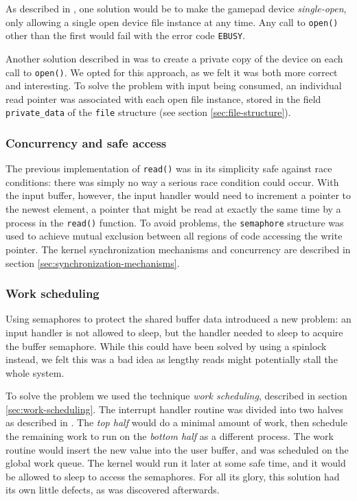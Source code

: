 As described in \cite{linux-device-drivers}, one solution would be to make the gamepad device \emph{single-open}, only allowing a single open device file instance at any time. Any call to \texttt{open()} other than the first would fail with the error code \texttt{EBUSY}.

Another solution described in \cite{linux-device-drivers} was to create a private copy of the device on each call to \texttt{open()}. We opted for this approach, as we felt it was both more correct and interesting. To solve the problem with input being consumed, an individual read pointer was associated with each open file instance, stored in the field \texttt{private\_data} of the \texttt{file} structure (see section \ref{sec:file-structure}).

\subsubsection{Concurrency and safe access}
The previous implementation of \texttt{read()} was in its simplicity safe against race conditions: there was simply no way a serious race condition could occur. With the input buffer, however, the input handler would need to increment a pointer to the newest element, a pointer that might be read at exactly the same time by a process in the \texttt{read()} function. To avoid problems, the \texttt{semaphore} structure was used to achieve mutual exclusion between all regions of code accessing the write pointer. The kernel synchronization mechanisms and concurrency are described in section \ref{sec:synchronization-mechanisms}.

\subsubsection{Work scheduling}
Using semaphores to protect the shared buffer data introduced a new problem: an input handler is not allowed to sleep, but the handler needed to sleep to acquire the buffer semaphore. While this could have been solved by using a spinlock instead, we felt this was a bad idea as lengthy reads might potentially stall the whole system.

To solve the problem we used the technique \emph{work scheduling}, described in section \ref{sec:work-scheduling}. The interrupt handler routine was divided into two halves as described in \cite{linux-device-drivers}. The \emph{top half} would do a minimal amount of work, then schedule the remaining work to run on the \emph{bottom half} as a different process. The work routine would insert the new value into the user buffer, and was scheduled on the global work queue. The kernel would run it later at some safe time, and it would be allowed to sleep to access the semaphores. For all its glory, this solution had its own little defects, as was discovered afterwards. 

